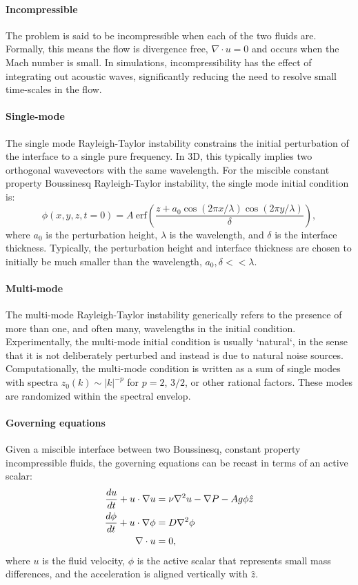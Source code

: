 \paragraph{Incompressible}
The problem is said to be incompressible when each of the two fluids are.
Formally, this means the flow is divergence free, $\nabla \cdot u = 0$ and occurs when the Mach number is small.
In simulations, incompressibility has the effect of integrating out acoustic waves, significantly reducing the need to resolve small time-scales in the flow.

\paragraph{Single-mode}
The single mode Rayleigh-Taylor instability constrains the initial perturbation of the interface to a single pure frequency.
In 3D, this typically implies two orthogonal wavevectors with the same wavelength.
For the miscible constant property Boussinesq Rayleigh-Taylor instability, the single mode initial condition is:
\begin{equation}
\phi(x,y,z,t=0) = A ~ \text{erf}\left(\frac{z + a_0 \cos(2 \pi x / \lambda) \cos(2 \pi y/\lambda)}{\delta}\right),
\end{equation}
where $a_0$ is the perturbation height,
$\lambda$ is the wavelength, and
$\delta$ is the interface thickness.
Typically, the perturbation height and interface thickness are chosen to initially be much smaller than the wavelength, $a_0, \delta << \lambda$.

\paragraph{Multi-mode}
The multi-mode Rayleigh-Taylor instability generically refers to the presence of more than one, and often many, wavelengths in the initial condition.
Experimentally, the multi-mode initial condition is usually `natural`, in the sense that it is not deliberately perturbed and instead is due to natural noise sources.
Computationally, the multi-mode condition is written as a sum of single modes with spectra $z_0(k) \sim |k|^{-p}$ for $p = 2$, $3/2$, or other rational factors.
These modes are randomized within the spectral envelop.

\paragraph{Governing equations}
Given a miscible interface between two Boussinesq, constant property incompressible fluids, the governing equations can be recast in terms of an active scalar:
\begin{align}
\frac{d u}{d t} + u \cdot \nabla u &= \nu \nabla^2 u - \nabla P - A g \phi \hat{z}\\
\frac{d \phi}{d t} + u \cdot \nabla \phi &= D \nabla^2 \phi \\
\nabla \cdot u  &= 0,
\end{align}
where $u$ is the fluid velocity, 
$\phi$ is the active scalar that represents small mass differences,
and the acceleration is aligned vertically with $\hat{z}$.

